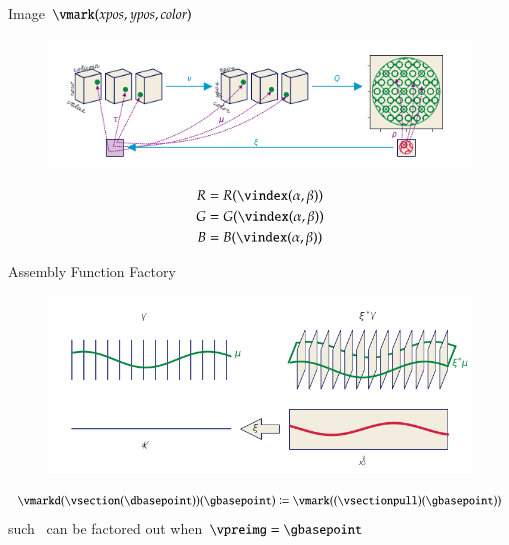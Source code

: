 \documentclass[xcolor={dvipsnames}, handout]{beamer}
\begin{document}
\begin{frame}{Image $\vmark(xpos, ypos, color)$}
    \begin{figure}[H]
        \includegraphics[width=1\textwidth]{figures/math/image.png}
    \end{figure}
    \begin{align*}
        R &= R(\vindex(\alpha, \beta))\\
        G &= G(\vindex(\alpha, \beta))\\
        B &= B(\vindex(\alpha, \beta))
    \end{align*}
\end{frame}

\begin{frame}{Assembly Function Factory}
\begin{figure}[H]
    \includegraphics[width=1\textwidth]{figures/math/q_hat.png}
\end{figure}
\begin{equation}
\label{eq:qhat_q_s}
\vmarkd(\vsection(\dbasepoint))(\gbasepoint) \coloneqq \vmark((\vsectionpull)(\gbasepoint))
\end{equation} 
such \gbasepoint\ can be factored out when $\vpreimg = \gbasepoint$
\end{frame}
\end{document}
